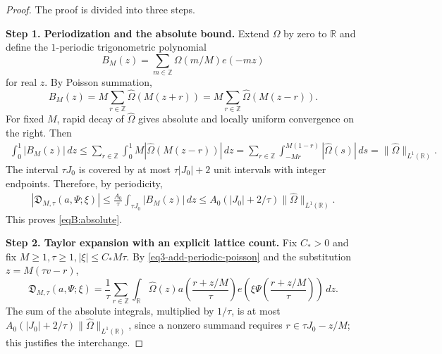 \documentclass[reqno,12pt]{amsart}
\def \Z {\mathbb Z}
\def \R {\mathbb R}
\numberwithin{equation}{section}
\begin{document}
\begin{proof}
The proof is divided into three steps.
	
\medskip
\noindent\textbf{Step 1. Periodization and the absolute bound.}
Extend $\Omega$ by zero to $\R$ and define the $1$-periodic
trigonometric polynomial
$$B_M(z)=\sum_{m\in\Z}\Omega(m/M)e(-mz)$$ for real $z$.
By Poisson summation,
\begin{equation}
 B_M(z)=M\sum_{r\in\Z}\widehat\Omega(M(z+r))=M\sum_{r\in\Z}\widehat\Omega(M(z-r)).
 \label{eq3-add-periodic-poisson}
\end{equation}
For fixed $M$, rapid decay of $\widehat\Omega$ gives absolute and
locally uniform convergence on the right.
Then
\[
 \begin{split}
 \int_0^1|B_M(z)|\,dz
 \le\sum_{r\in\Z}\int_0^1M|\widehat\Omega(M(z-r))|\,dz
 =\sum_{r\in\Z}\int_{-Mr}^{M(1-r)}|\widehat\Omega(s)|\,ds
 =\|\widehat\Omega\|_{L^{1}(\R)}.
 \end{split}
\]
The interval $\tau J_0$ is covered by at most $\tau|J_0|+2$
unit intervals with integer endpoints. Therefore, by periodicity,
\[
 \begin{split}
 |\mathfrak D_{M,\tau}(a,\Psi;\xi)|
 \le\frac{A_0}{\tau}\int_{\tau J_0}|B_M(z)|\,dz
 \le A_0\left(|J_0|+2/\tau\right)\|\widehat\Omega\|_{L^{1}(\R)}.
 \end{split}
\]
This proves \eqref{eqB:absolute}.


\medskip
\noindent\textbf{Step 2. Taylor expansion with an explicit lattice count.}
Fix $C_{*}>0$ and fix $M\ge 1,\tau\ge 1,|\xi|\le C_{*}M\tau$. 
By \eqref{eq3-add-periodic-poisson}
and the substitution $z=M(\tau v-r)$,
\begin{equation}
\mathfrak D_{M,\tau}(a,\Psi;\xi)
=\frac1\tau\sum_{r\in\Z}\int_\R\widehat\Omega(z)
a\left(\frac{r+z/M}{\tau}\right)
e\left(\xi\Psi\left(\frac{r+z/M}{\tau}\right)\right)\,dz.
\label{eq3-add-dual-exact}
\end{equation}
The sum of the absolute integrals, multiplied by $1/\tau$, is at most
$A_0(|J_0|+2/\tau)\|\widehat\Omega\|_{L^{1}(\R)}$, since a nonzero
summand requires $r\in\tau J_0-z/M$; this justifies the interchange.


\end{proof}
\end{document}
